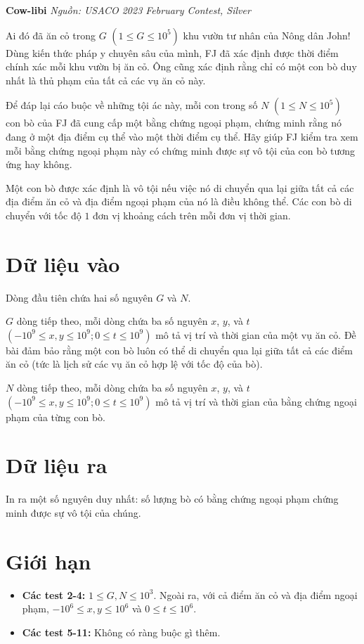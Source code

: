 \documentclass[12pt,a4paper]{article}
\newcommand{\problem}[2]{%
  \addcontentsline{toc}{section}{#1}%
  \begin{mdframed}[
    linecolor=framecolor,
    linewidth=1.5pt,
    backgroundcolor=white,
    topline=true, bottomline=true,
    leftline=true, rightline=true,
    innerleftmargin=10pt, innerrightmargin=10pt,
    innertopmargin=6pt, innerbottommargin=6pt,
  ]
  \textbf{\large #1} \hfill \textit{Nguồn: #2}
  \end{mdframed}
  \vspace{4pt}%
}
\begin{document}
\problem{Cow-libi}{USACO 2023 February Contest, Silver}

Ai đó đã ăn cỏ trong $G$ $(1 \le G \le 10^5)$ khu vườn tư nhân của Nông dân John! Dùng kiến thức pháp y chuyên sâu của mình, FJ đã xác định được thời điểm chính xác mỗi khu vườn bị ăn cỏ. Ông cũng xác định rằng chỉ có một con bò duy nhất là thủ phạm của tất cả các vụ ăn cỏ này.

Để đáp lại cáo buộc về những tội ác này, mỗi con trong số $N$ $(1 \le N \le 10^5)$ con bò của FJ đã cung cấp một bằng chứng ngoại phạm, chứng minh rằng nó đang ở một địa điểm cụ thể vào một thời điểm cụ thể. Hãy giúp FJ kiểm tra xem mỗi bằng chứng ngoại phạm này có chứng minh được sự vô tội của con bò tương ứng hay không.

Một con bò được xác định là vô tội nếu việc nó di chuyển qua lại giữa tất cả các địa điểm ăn cỏ và địa điểm ngoại phạm của nó là điều không thể. Các con bò di chuyển với tốc độ $1$ đơn vị khoảng cách trên mỗi đơn vị thời gian.

\section*{Dữ liệu vào}
\begin{inputbox}
Dòng đầu tiên chứa hai số nguyên $G$ và $N$.

$G$ dòng tiếp theo, mỗi dòng chứa ba số nguyên $x$, $y$, và $t$ $(-10^9 \le x, y \le 10^9; 0 \le t \le 10^9)$ mô tả vị trí và thời gian của một vụ ăn cỏ. Đề bài đảm bảo rằng một con bò luôn có thể di chuyển qua lại giữa tất cả các điểm ăn cỏ (tức là lịch sử các vụ ăn cỏ hợp lệ với tốc độ của bò).

$N$ dòng tiếp theo, mỗi dòng chứa ba số nguyên $x$, $y$, và $t$ $(-10^9 \le x, y \le 10^9; 0 \le t \le 10^9)$ mô tả vị trí và thời gian của bằng chứng ngoại phạm của từng con bò.
\end{inputbox}

\section*{Dữ liệu ra}
\begin{outputbox}
In ra một số nguyên duy nhất: số lượng bò có bằng chứng ngoại phạm chứng minh được sự vô tội của chúng.
\end{outputbox}

\section*{Giới hạn}
\begin{constraintbox}
\begin{itemize}[leftmargin=*]
    \item \textbf{Các test 2-4:} $1 \le G, N \le 10^3$. Ngoài ra, với cả điểm ăn cỏ và địa điểm ngoại phạm, $-10^6 \le x, y \le 10^6$ và $0 \le t \le 10^6$.
    \item \textbf{Các test 5-11:} Không có ràng buộc gì thêm.
\end{itemize}
\end{constraintbox}
\end{document}
